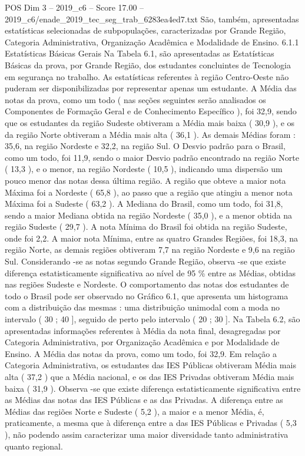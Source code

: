 \begin{textsample}{POS Dim 3 – 2019\_c6 – Score 17.00 – 2019\_c6/enade\_2019\_tec\_seg\_trab\_6283ea4ed7.txt}
São, também, apresentadas estatísticas selecionadas de subpopulações, caracterizadas por Grande Região, Categoria Administrativa, Organização Acadêmica e Modalidade de Ensino. 6.1.1 Estatísticas Básicas Gerais Na Tabela 6.1, são apresentadas as Estatísticas Básicas da prova, por Grande Região, dos estudantes concluintes de Tecnologia em segurança no trabalho.
As estatísticas referentes à região Centro-Oeste não puderam ser disponibilizadas por representar apenas um estudante.
A Média das notas da prova, como um todo ( nas seções seguintes serão analisados os Componentes de Formação Geral e de Conhecimento Específico ), foi 32,9, sendo que os estudantes da região Sudeste obtiveram a Média mais baixa ( 30,9 ), e os da região Norte obtiveram a Média mais alta ( 36,1 ).
As demais Médias foram : 35,6, na região Nordeste e 32,2, na região Sul.
O Desvio padrão para o Brasil, como um todo, foi 11,9, sendo o maior Desvio padrão encontrado na região Norte ( 13,3 ), e o menor, na região Nordeste ( 10,5 ), indicando uma dispersão um pouco menor das notas dessa última região.
A região que obteve a maior nota Máxima foi a Nordeste ( 65,8 ), ao passo que a região que atingiu a menor nota Máxima foi a Sudeste ( 63,2 ).
A Mediana do Brasil, como um todo, foi 31,8, sendo a maior Mediana obtida na região Nordeste ( 35,0 ), e a menor obtida na região Sudeste ( 29,7 ).
A nota Mínima do Brasil foi obtida na região Sudeste, onde foi 2,2.
A maior nota Mínima, entre as quatro Grandes Regiões, foi 18,3, na região Norte, as demais regiões obtiveram 7,7 na região Nordeste e 9,6 na região Sul.
Considerando -se as notas segundo Grande Região, observa -se que existe diferença estatisticamente significativa ao nível de 95 \% entre as Médias, obtidas nas regiões Sudeste e Nordeste.
O comportamento das notas dos estudantes de todo o Brasil pode ser observado no Gráfico 6.1, que apresenta um histograma com a distribuição das mesmas : uma distribuição unimodal com a moda no intervalo ( 30 ; 40 ], seguido de perto pelo intervalo ( 20 ; 30 ].
Na Tabela 6.2, são apresentadas informações referentes à Média da nota final, desagregadas por Categoria Administrativa, por Organização Acadêmica e por Modalidade de Ensino.
A Média das notas da prova, como um todo, foi 32,9.
Em relação a Categoria Administrativa, os estudantes das IES Públicas obtiveram Média mais alta ( 37,2 ) que a Média nacional, e os das IES Privadas obtiveram Média mais baixa ( 31,9 ).
Observa -se que existe diferença estatisticamente significativa entre as Médias das notas das IES Públicas e as das Privadas.
A diferença entre as Médias das regiões Norte e Sudeste ( 5,2 ), a maior e a menor Média, é, praticamente, a mesma que à diferença entre a das IES Públicas e Privadas ( 5,3 ), não podendo assim caracterizar uma maior diversidade tanto administrativa quanto regional.

\end{textsample}
